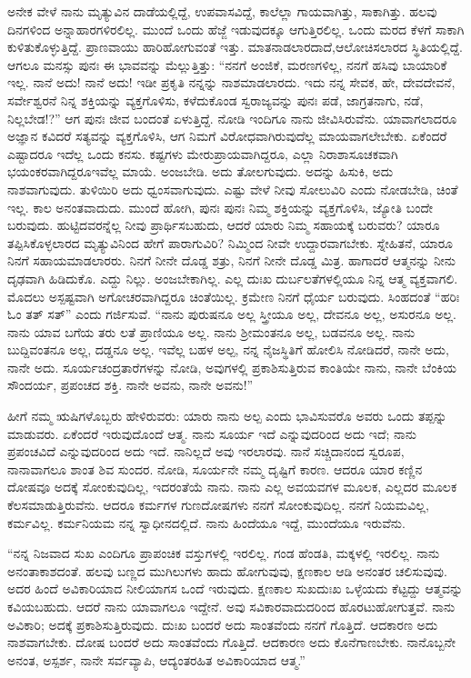 ಅನೇಕ ವೇಳೆ ನಾನು ಮೃತ್ಯುವಿನ ದಾಡೆಯಲ್ಲಿದ್ದೆ, ಉಪವಾಸವಿದ್ದೆ, ಕಾಲೆಲ್ಲಾ ಗಾಯವಾಗಿತ್ತು, ಸಾಕಾಗಿತ್ತು. ಹಲವು ದಿನಗಳಿಂದ ಅನ್ನಾಹಾರಗಳಿರಲಿಲ್ಲ. ಮುಂದೆ ಒಂದು ಹೆಜ್ಜೆ ಇಡುವುದಕ್ಕೂ ಆಗುತ್ತಿರಲಿಲ್ಲ. ಒಂದು ಮರದ ಕೆಳಗೆ ಸಾಕಾಗಿ ಕುಳಿತುಕೊಳ್ಳುತ್ತಿದ್ದೆ. ಪ್ರಾಣವಾಯು ಹಾರಿಹೋಗುವಂತೆ ಇತ್ತು. ಮಾತನಾಡಲಾರದಾದೆ,\break ಆಲೋಚಿಸಲಾರದ ಸ್ಥಿತಿಯಲ್ಲಿದ್ದೆ. ಆಗಲೂ ಮನಸ್ಸು ಪುನಃ ಈ ಭಾವವನ್ನು ಮೆಲ್ಲುತ್ತಿತ್ತು: “ನನಗೆ ಅಂಜಿಕೆ, ಮರಣಗಳಿಲ್ಲ, ನನಗೆ ಹಸಿವು ಬಾಯಾರಿಕೆ ಇಲ್ಲ. ನಾನೆ ಅದು! ನಾನೆ ಅದು! ಇಡೀ ಪ್ರಕೃತಿ ನನ್ನನ್ನು ನಾಶಮಾಡಲಾರದು. ಇದು ನನ್ನ ಸೇವಕ, ಹೇ, ದೇವದೇವನೆ, ಸರ್ವೇಶ್ವರನೆ ನಿನ್ನ ಶಕ್ತಿಯನ್ನು ವ್ಯಕ್ತಗೊಳಿಸು, ಕಳೆದುಕೊಂಡ ಸ್ವರಾಜ್ಯವನ್ನು ಪುನಃ ಪಡೆ, ಜಾಗ್ರತನಾಗು, ನಡೆ, ನಿಲ್ಲಬೇಡ!?” ಆಗ ಪುನಃ ಜೀವ ಬಂದಂತೆ ಏಳುತ್ತಿದ್ದೆ. ನೋಡಿ ಇಂದಿಗೂ ನಾನು ಜೀವಿಸಿರುವೆನು. ಯಾವಾಗಲಾದರೂ ಅಜ್ಞಾನ ಕವಿದರೆ ಸತ್ಯವನ್ನು ವ್ಯಕ್ತಗೊಳಿಸಿ, ಆಗ ನಿಮಗೆ ವಿರೋಧವಾಗಿರುವುದೆಲ್ಲ ಮಾಯವಾಗಲೇಬೇಕು. ಏಕೆಂದರೆ ಎಷ್ಟಾದರೂ ಇದೆಲ್ಲ ಒಂದು ಕನಸು. ಕಷ್ಟಗಳು ಮೇರುಪ್ರಾಯವಾಗಿದ್ದರೂ, ಎಲ್ಲಾ ನಿರಾಶಾಸೂಚಕವಾಗಿ ಭಯಂಕರವಾಗಿದ್ದರೂ\break ಇವೆಲ್ಲ ಮಾಯೆ. ಅಂಜಬೇಡಿ. ಅದು ತೋಲಗುವುದು. ಅದನ್ನು ಹಿಸುಕಿ, ಅದು ನಾಶವಾಗುವುದು. ತುಳಿಯಿರಿ ಅದು ಧ್ವಂಸವಾಗುವುದು. ಎಷ್ಟು ವೇಳೆ ನೀವು ಸೋಲುವಿರಿ ಎಂದು ನೋಡಬೇಡಿ, ಚಿಂತೆ ಇಲ್ಲ. ಕಾಲ ಅನಂತವಾದುದು. ಮುಂದೆ ಹೋಗಿ, ಪುನಃ ಪುನಃ ನಿಮ್ಮ ಶಕ್ತಿಯನ್ನು ವ್ಯಕ್ತಗೊಳಿಸಿ, ಜ್ಯೋತಿ ಬಂದೇ ಬರುವುದು. ಹುಟ್ಟಿದವರನ್ನೆಲ್ಲ ನೀವು ಪ್ರಾರ್ಥಿಸಬಹುದು, ಆದರೆ ಯಾರು ನಿಮ್ಮ ಸಹಾಯಕ್ಕೆ ಬರುವರು? ಯಾರೂ ತಪ್ಪಿಸಿಕೊಳ್ಳಲಾರದ ಮೃತ್ಯುವಿನಿಂದ ಹೇಗೆ ಪಾರಾಗುವಿರಿ? ನಿಮ್ಮಿಂದ ನೀವೇ ಉದ್ದಾರವಾಗಬೇಕು. ಸ್ನೇಹಿತನೆ, ಯಾರೂ ನಿನಗೆ ಸಹಾಯಮಾಡಲಾರರು. ನಿನಗೆ ನೀನೇ ದೊಡ್ಡ ಶತ್ರು, ನಿನಗೆ ನೀನೇ ದೊಡ್ಡ ಮಿತ್ರ. ಹಾಗಾದರೆ ಆತ್ಮನನ್ನು ನೀನು ದೃಢವಾಗಿ ಹಿಡಿದುಕೊ. ಎದ್ದು ನಿಲ್ಲು. ಅಂಜಬೇಕಾಗಿಲ್ಲ. ಎಲ್ಲ ದುಃಖ ದುರ್ಬಲತೆಗಳಲ್ಲಿಯೂ ನಿನ್ನ ಆತ್ಮ ವ್ಯಕ್ತವಾಗಲಿ. ಮೊದಲು ಅಸ್ಪಷ್ಟವಾಗಿ ಅಗೋಚರವಾಗಿದ್ದರೂ ಚಿಂತೆಯಿಲ್ಲ. ಕ್ರಮೇಣ ನಿನಗೆ ಧೈರ್ಯ ಬರುವುದು. ಸಿಂಹದಂತೆ “ಹರಿಃ ಓಂ ತತ್ ಸತ್'' ಎಂದು ಗರ್ಜಿಸುವೆ. “ನಾನು ಪುರುಷನೂ ಅಲ್ಲ ಸ್ತ್ರೀಯೂ ಅಲ್ಲ, ದೇವನೂ ಅಲ್ಲ, ಅಸುರನೂ ಅಲ್ಲ. ನಾನು ಯಾವ ಬಗೆಯ ತರು ಲತೆ ಪ್ರಾಣಿಯೂ ಅಲ್ಲ. ನಾನು ಶ‍್ರೀಮಂತನೂ ಅಲ್ಲ, ಬಡವನೂ ಅಲ್ಲ. ನಾನು ಬುದ್ದಿವಂತನೂ ಅಲ್ಲ, ದಡ್ಡನೂ ಅಲ್ಲ. ಇವೆಲ್ಲ ಬಹಳ ಅಲ್ಪ, ನನ್ನ ನೈಜಸ್ಥಿತಿಗೆ ಹೋಲಿಸಿ ನೋಡಿದರೆ, ನಾನೇ ಅದು, ನಾನೇ ಅದು. ಸೂರ್ಯಚಂದ್ರತಾರೆಗಳನ್ನು ನೋಡಿ, ಅವುಗಳಲ್ಲಿ ಪ್ರಕಾಶಿಸುತ್ತಿರುವ ಕಾಂತಿಯೇ ನಾನು, ನಾನೇ ಬೆಂಕಿಯ ಸೌಂದರ್ಯ, ಪ್ರಪಂಚದ ಶಕ್ತಿ. ನಾನೇ ಅವನು, ನಾನೇ ಅವನು!”

ಹೀಗೆ ನಮ್ಮ ಋಷಿಗಳೊಬ್ಬರು ಹೇಳಿರುವರು: ಯಾರು ನಾನು ಅಲ್ಪ ಎಂದು ಭಾವಿಸುವರೊ ಅವರು ಒಂದು ತಪ್ಪನ್ನು ಮಾಡುವರು. ಏಕೆಂದರೆ ಇರುವುದೊಂದೆ ಆತ್ಮ. ನಾನು ಸೂರ್ಯ ಇದೆ ಎನ್ನುವುದರಿಂದ ಅದು ಇದೆ; ನಾನು ಪ್ರಪಂಚವಿದೆ ಎನ್ನುವುದರಿಂದ ಅದು ಇದೆ. ನಾನಿಲ್ಲದೆ ಅವು ಇರಲಾರವು. ನಾನೆ ಸಚ್ಚಿದಾನಂದ ಸ್ವರೂಪ, ನಾನಾವಾಗಲೂ ಶಾಂತ ಶಿವ ಸುಂದರ. ನೋಡಿ, ಸೂರ್ಯನೇ ನಮ್ಮ ದೃಷ್ಟಿಗೆ ಕಾರಣ. ಆದರೂ ಯಾರ ಕಣ್ಣಿನ ದೋಷವೂ ಅದಕ್ಕೆ ಸೋಂಕುವುದಿಲ್ಲ, ಇದರಂತೆಯೆ ನಾನು. ನಾನು ಎಲ್ಲ ಅವಯವಗಳ ಮೂಲಕ, ಎಲ್ಲದರ ಮೂಲಕ ಕೆಲಸಮಾಡುತ್ತಿರುವೆನು. ಆದರೂ ಕರ್ಮಗಳ ಗುಣದೋಷಗಳು ನನಗೆ ಸೋಂಕುವುದಿಲ್ಲ. ನನಗೆ ನಿಯಮವಿಲ್ಲ, ಕರ್ಮವಿಲ್ಲ. ಕರ್ಮನಿಯಮ ನನ್ನ ಸ್ವಾಧೀನದಲ್ಲಿದೆ. ನಾನು ಹಿಂದೆಯೂ ಇದ್ದೆ, ಮುಂದೆಯೂ ಇರುವೆನು.

“ನನ್ನ ನಿಜವಾದ ಸುಖ ಎಂದಿಗೂ ಪ್ರಾಪಂಚಿಕ ವಸ್ತುಗಳಲ್ಲಿ ಇರಲಿಲ್ಲ. ಗಂಡ ಹೆಂಡತಿ, ಮಕ್ಕಳಲ್ಲಿ ಇರಲಿಲ್ಲ. ನಾನು ಅನಂತಾಕಾಶದಂತೆ. ಹಲವು ಬಣ್ಣದ ಮುಗಿಲುಗಳು ಹಾದು ಹೋಗುವುವು, ಕ್ಷಣಕಾಲ ಆಡಿ ಅನಂತರ ಚಲಿಸುವುವು. ಅದರ ಹಿಂದೆ ಅವಿಕಾರಿಯಾದ ನೀಲಿಯಾಗಸ ಒಂದೆ ಇರುವುದು. ಕ್ಷಣಕಾಲ ಸುಖದುಃಖ ಒಳ್ಳೆಯದು ಕೆಟ್ಟದ್ದು ಆತ್ಮವನ್ನು ಕವಿಯಬಹುದು. ಆದರೆ ನಾನು ಯಾವಾಗಲೂ ಇದ್ದೇನೆ. ಅವು ಸವಿಕಾರವಾದುದರಿಂದ ಹೊರಟುಹೋಗುತ್ತವೆ. ನಾನು ಅವಿಕಾರಿ; ಅದಕ್ಕೆ ಪ್ರಕಾಶಿಸುತ್ತಿರುವುದು. ದುಃಖ ಬಂದರೆ ಅದು ಸಾಂತವೆಂದು ನನಗೆ ಗೊತ್ತಿದೆ. ಆದಕಾರಣ ಅದು ನಾಶವಾಗಬೇಕು. ದೋಷ ಬಂದರೆ ಅದು ಸಾಂತವೆಂದು ಗೊತ್ತಿದೆ. ಆದಕಾರಣ ಅದು ಕೊನೆಗಾಣಬೇಕು. ನಾನೊಬ್ಬನೇ ಅನಂತ, ಅಸ್ಪರ್ಶ, ನಾನೇ ಸರ್ವವ್ಯಾಪಿ, ಆದ್ಯಂತರಹಿತ ಅವಿಕಾರಿಯಾದ ಆತ್ಮ.''


